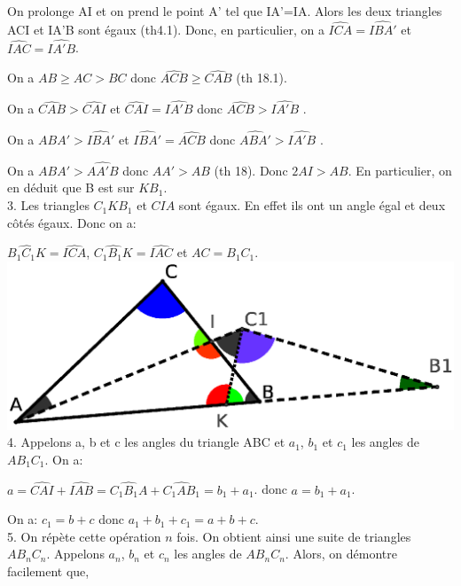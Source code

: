 \documentclass[a4paper, 12pt, twoside]{book}
\begin{document}
     On prolonge AI et on prend le point A' tel que IA'=IA. Alors les deux triangles ACI et IA'B sont égaux (th4.1). Donc, en particulier, on a  $\hat{ICA}=\hat{IBA'}$ et  $\hat{IAC}=\hat{IA'B}$.\
     
 On a  $AB\geq AC>BC$ donc $\hat{ACB}\geq \hat{CAB}$ (th 18.1).\
 
 On a  $\hat{CAB}>\hat{CAI}$ et $\hat{CAI}=\hat{IA'B}$ donc $\hat{ACB}>\hat{IA'B}$ .\
 
  On a  $\hat{ABA'}>\hat{IBA'}$ et $\hat{IBA'}=\hat{ACB}$ donc $\hat{ABA'}>\hat{IA'B}$ .\
  
  On a  $\hat{ABA'}>\hat{AA'B}$ donc $AA'>AB$ (th 18). Donc $2AI>AB$. En particulier, on en déduit que B est sur $KB_{1}$.\\
  
   
  
  
  
   3.  Les triangles $C_{1}KB_{1}$ et $CIA$ sont égaux. En effet ils ont un angle égal et deux côtés égaux. Donc on a:\
   
   $\hat{B_{1}C_{1}K}=\hat{ICA}$,  $\hat{C_{1}B_{1}K}=\hat{IAC}$ et $AC=B_{1}C_{1}$.\\  
 
 
   \includegraphics[scale=0.5]{figures/Legendre1.eps} \\
   
   
   4. Appelons a, b et c les angles du triangle ABC et $a_{1}$, $b_{1}$ et $c_{1}$ les angles de $AB_{1}C_{1}$. On a:\
   
   $a=\hat{CAI}+\hat{IAB}=\hat{C_{1}B_{1}A}+\hat{C_{1}AB_{1}}=b_{1}+a_{1}$. donc  $a=b_{1}+a_{1}$.\
   
   On a: $c_{1}=b+c$ donc $a_{1}+b_{1}+c_{1}=a+b+c$.\\
   
      
   
   
   5. On répète cette opération $n$ fois. On obtient ainsi une suite de triangles $AB_{n}C_{n}$. Appelons $a_{n}$, $b_{n}$ et $c_{n}$ les angles de $AB_{n}C_{n}$.  Alors, on démontre facilement que,\
   
\end{document}
